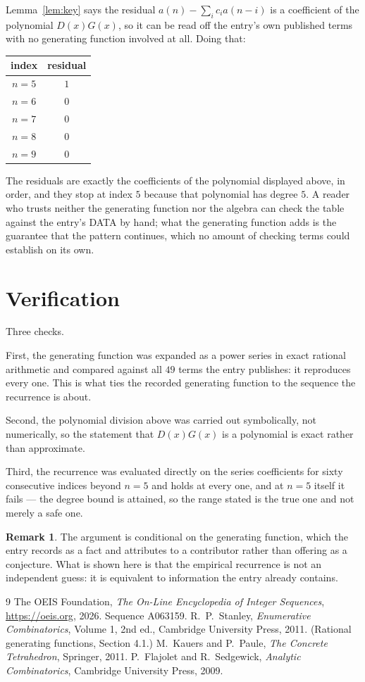 \documentclass[11pt,a4paper]{article}
\theoremstyle{plain}
\theoremstyle{definition}
\newtheorem{remark}[theorem]{Remark}
\begin{document}
Lemma~\ref{lem:key} says the residual $a(n)-\sum_ic_ia(n-i)$ is a coefficient of the
polynomial $D(x)G(x)$, so it can be read off the entry's own published terms with no
generating function involved at all. Doing that:
\begin{center}
\begin{tabular}{cc}
index & residual \\ \hline
$n=5$ & $1$ \\
$n=6$ & $0$ \\
$n=7$ & $0$ \\
$n=8$ & $0$ \\
$n=9$ & $0$
\end{tabular}
\end{center}
The residuals are exactly the coefficients of the polynomial displayed above, in order, and
they stop at index $5$ because that polynomial has degree $5$. A reader who trusts
neither the generating function nor the algebra can check the table against the entry's DATA
by hand; what the generating function adds is the guarantee that the pattern continues, which
no amount of checking terms could establish on its own.

\section{Verification}

Three checks.

First, the generating function was expanded as a power series in exact rational arithmetic and
compared against all $49$ terms the entry publishes: it reproduces every one. This is
what ties the recorded generating function to the sequence the recurrence is about.

Second, the polynomial division above was carried out symbolically, not numerically, so the
statement that $D(x)G(x)$ is a polynomial is exact rather than approximate.

Third, the recurrence was evaluated directly on the series coefficients for sixty consecutive
indices beyond $n=5$ and holds at every one, and at $n=5$ itself it fails --- the
degree bound is attained, so the range stated is the true one and not merely a safe one.

\begin{remark}
The argument is conditional on the generating function, which the entry records as a fact and
attributes to a contributor rather than offering as a conjecture. What is shown here is that
the empirical recurrence is not an independent guess: it is equivalent to information the
entry already contains.
\end{remark}

\begin{thebibliography}{9}
 The OEIS Foundation, \emph{The On-Line Encyclopedia of Integer
Sequences}, \url{https://oeis.org}, 2026. Sequence A063159.
 R.~P.~Stanley, \emph{Enumerative Combinatorics}, Volume 1, 2nd ed.,
Cambridge University Press, 2011. (Rational generating functions, Section 4.1.)
 M.~Kauers and P.~Paule, \emph{The Concrete Tetrahedron}, Springer, 2011.
 P.~Flajolet and R.~Sedgewick, \emph{Analytic Combinatorics}, Cambridge
University Press, 2009.
\end{thebibliography}
\end{document}
